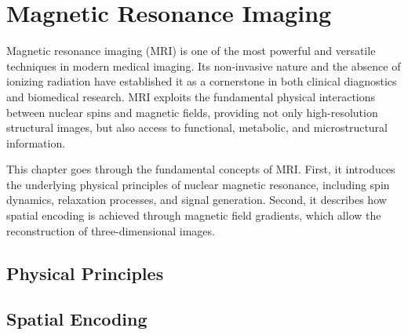 \chapter{Magnetic Resonance Imaging} \label{chap:MagneticResonanceImaging}
\vspace{1cm}

Magnetic resonance imaging (MRI) is one of the most powerful and versatile techniques in modern medical imaging. Its non-invasive nature and the absence of ionizing radiation have established it as a cornerstone in both clinical diagnostics and biomedical research. MRI exploits the fundamental physical interactions between nuclear spins and magnetic fields, providing not only high-resolution structural images, but also access to functional, metabolic, and microstructural information.

This chapter goes through the fundamental concepts of MRI. First, it introduces the underlying physical principles of nuclear magnetic resonance, including spin dynamics, relaxation processes, and signal generation. Second, it describes how spatial encoding is achieved through magnetic field gradients, which allow the reconstruction of three-dimensional images.

\section{Physical Principles}

\section{Spatial Encoding}
